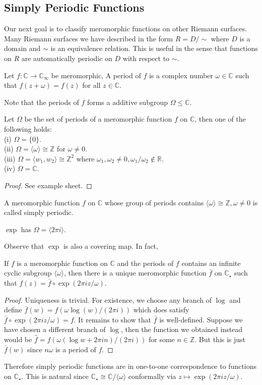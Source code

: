 \subsection{Simply Periodic Functions}
Our next goal is to classify meromorphic functions on other Riemann surfaces.
Many Riemann surfaces we have described in the form $R=D/\sim$ where $D$ is a domain and $\sim$ is an equivalence relation.
This is useful in the sense that functions on $R$ are automatically periodic on $D$ with respect to $\sim$.
\begin{definition}
    Let $f:\mathbb C\to\mathbb C_\infty$ be meromorphic,
    A period of $f$ is a complex number $\omega\in\mathbb C$ such that $f(z+\omega)=f(z)$ for all $z\in\mathbb C$.
\end{definition}
Note that the periods of $f$ forms a additive subgroup $\Omega\le\mathbb C$.
\begin{lemma}
    Let $\Omega$ be the set of periods of a meromorphic function $f$ on $\mathbb C$, then one of the following holds:\\
    (i) $\Omega=\{0\}$.\\
    (ii) $\Omega=\langle \omega\rangle\cong\mathbb Z$ for $\omega\neq 0$.\\
    (iii) $\Omega=\langle w_1,w_2\rangle\cong\mathbb Z^2$ where $\omega_1,\omega_2\neq 0,\omega_1/\omega_2\notin\mathbb R$.\\
    (iv) $\Omega=\mathbb C$.
\end{lemma}
\begin{proof}
    See example sheet.
\end{proof}
\begin{definition}
    A meromorphic function $f$ on $\mathbb C$ whose group of periods contains $\langle\omega\rangle\cong\mathbb Z,\omega\neq 0$ is called simply periodic.
\end{definition}
\begin{example}
    $\exp$ has $\Omega=\langle 2\pi i\rangle$.
\end{example}
Observe that $\exp$ is also a covering map.
In fact,
\begin{proposition}\label{simply_periodic}
    If $f$ is a meromorphic function on $\mathbb C$ and the periods of $f$ contains an infinite cyclic subgroup $\langle\omega\rangle$, then there is a unique meromorphic function $\bar{f}$ on $\mathbb C_\star$ such that $f(z)=\bar{f}\circ\exp(2\pi iz/\omega)$.
\end{proposition}
\begin{proof}
    Uniqueness is trivial.
    For existence, we choose any branch of $\log$ and define $\bar{f}(w)=f(\omega\log(w)/(2\pi i))$ which does satisfy $\bar{f}\circ\exp(2\pi iz/\omega)=f$.
    It remains to show that $\bar{f}$ is well-defined.
    Suppose we have chosen a different branch of $\log$, then the function we obtained instead would be $\hat{f}=f(\omega(\log w+2\pi in)/(2\pi i))$ for some $n\in\mathbb Z$.
    But this is just $\bar{f}(w)$ since $n\omega$ is a period of $f$.
\end{proof}
Therefore simply periodic functions are in one-to-one correspondence to functions on $\mathbb C_\star$.
This is natural since $\mathbb C_\star\cong\mathbb C/\langle\omega\rangle$ conformally via $z\mapsto\exp(2\pi iz/\omega)$.